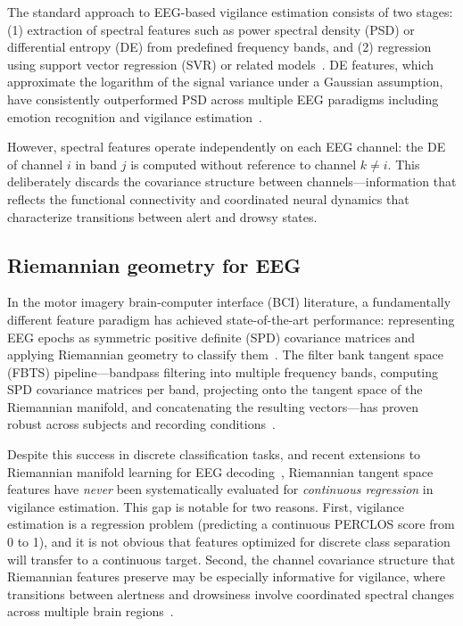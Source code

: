 \documentclass{iopjournal}
\begin{document}
The standard approach to EEG-based vigilance estimation consists of two stages: (1) extraction of spectral features such as power spectral density (PSD) or differential entropy (DE) from predefined frequency bands, and (2) regression using support vector regression (SVR) or related models~\cite{zheng2017multimodal,huo2016driving}. DE features, which approximate the logarithm of the signal variance under a Gaussian assumption, have consistently outperformed PSD across multiple EEG paradigms including emotion recognition and vigilance estimation~\cite{duan2013differential,shi2013differential}.

However, spectral features operate independently on each EEG channel: the DE of channel $i$ in band $j$ is computed without reference to channel $k \neq i$. This deliberately discards the covariance structure between channels---information that reflects the functional connectivity and coordinated neural dynamics that characterize transitions between alert and drowsy states.

\subsection{Riemannian geometry for EEG}

In the motor imagery brain-computer interface (BCI) literature, a fundamentally different feature paradigm has achieved state-of-the-art performance: representing EEG epochs as symmetric positive definite (SPD) covariance matrices and applying Riemannian geometry to classify them~\cite{congedo2017riemannian,barachant2012multiclass}. The filter bank tangent space (FBTS) pipeline---bandpass filtering into multiple frequency bands, computing SPD covariance matrices per band, projecting onto the tangent space of the Riemannian manifold, and concatenating the resulting vectors---has proven robust across subjects and recording conditions~\cite{barachant2012multiclass}.

Despite this success in discrete classification tasks, and recent extensions to Riemannian manifold learning for EEG decoding~\cite{yger2017riemannian,lotte2018review}, Riemannian tangent space features have \emph{never} been systematically evaluated for \emph{continuous regression} in vigilance estimation. This gap is notable for two reasons. First, vigilance estimation is a regression problem (predicting a continuous PERCLOS score from 0 to 1), and it is not obvious that features optimized for discrete class separation will transfer to a continuous target. Second, the channel covariance structure that Riemannian features preserve may be especially informative for vigilance, where transitions between alertness and drowsiness involve coordinated spectral changes across multiple brain regions~\cite{zheng2017multimodal}.
\end{document}
